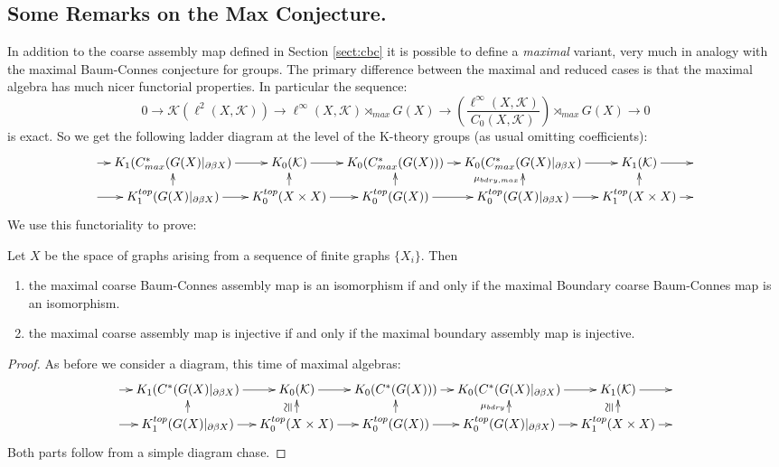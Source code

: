 \subsection{Some Remarks on the Max Conjecture.}

In addition to the coarse assembly map defined in Section \ref{sect:cbc} it is possible to define a \textit{maximal} variant, very much in analogy with the maximal Baum-Connes conjecture for groups. The primary difference between the maximal and reduced cases is that the maximal algebra has much nicer functorial properties. In particular the sequence:
\begin{equation*}
0 \rightarrow \mathcal{K}(\ell^{2}(X,\mathcal{K})) \rightarrow \ell^{\infty}(X,\mathcal{K})\rtimes_{max}G(X) \rightarrow (\frac{\ell^{\infty}(X,\mathcal{K})}{C_{0}(X,\mathcal{K})})\rtimes_{max}G(X) \rightarrow 0
\end{equation*}
is exact. So we get the following ladder diagram at the level of the K-theory groups (as usual omitting coefficients):
\begin{equation*}
\xymatrix@=1em{
\ar[r] & K_{1}(C^{*}_{max}(G(X)|_{\partial\beta X}) \ar[r] & K_{0}(\mathcal{K}) \ar[r]& K_{0}(C^{*}_{max}(G(X))) \ar[r]& K_{0}(C^{*}_{max}(G(X)|_{\partial\beta X})\ar[r] & K_{1}(\mathcal{K})\ar[r] &  \\
\ar[r] & K_{1}^{top}(G(X)|_{\partial\beta X}) \ar[r] \ar[u]& K_{0}^{top}(X \times X) \ar[r]\ar[u]& K_{0}^{top}(G(X)) \ar[r]\ar[u]& K_{0}^{top}(G(X)|_{\partial\beta X}) \ar[r]\ar[u]^{\mu_{bdry,max}}& K_{1}^{top}(X \times X)\ar[u]\ar[r] &
}
\end{equation*}
We use this functoriality to prove:
\begin{proposition}\label{Prop:Max}
Let $X$ be the space of graphs arising from a sequence of finite graphs $\lbrace X_{i} \rbrace$. Then
\begin{enumerate}
\item the maximal coarse Baum-Connes assembly map is an isomorphism if and only if the maximal Boundary coarse Baum-Connes map is an isomorphism.
\item the maximal coarse assembly map is injective if and only if the maximal boundary assembly map is injective.
\end{enumerate}
\end{proposition}
\begin{proof}
As before we consider a diagram, this time of maximal algebras:
\begin{equation*}
\xymatrix@=1em{
\ar[r] &K_{1}(C^{*}(G(X)|_{\partial\beta X}) \ar[r] & K_{0}(\mathcal{K}) \ar[r]& K_{0}(C^{*}(G(X))) \ar[r]& K_{0}(C^{*}(G(X)|_{\partial\beta X})\ar[r] & K_{1}(\mathcal{K})\ar[r] &  \\
\ar[r] & K_{1}^{top}(G(X)|_{\partial\beta X}) \ar[r] \ar[u]& K_{0}^{top}(X \times X) \ar[r]\ar[u]^{\ucong}& K_{0}^{top}(G(X)) \ar[r]\ar[u]& K_{0}^{top}(G(X)|_{\partial\beta X}) \ar[r]\ar[u]^{\mu_{bdry}}& K_{1}^{top}(X \times X)\ar[u]^{\ucong} \ar[r] &
}
\end{equation*}
Both parts follow from a simple diagram chase.
\end{proof}

